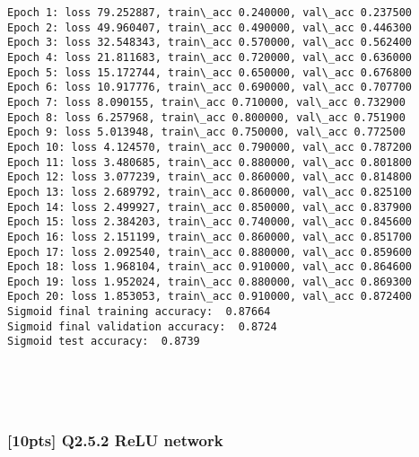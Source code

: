 \documentclass[11pt]{article}
\begin{document}
    \begin{Verbatim}[commandchars=\\\{\}]
Epoch 1: loss 79.252887, train\_acc 0.240000, val\_acc 0.237500
Epoch 2: loss 49.960407, train\_acc 0.490000, val\_acc 0.446300
Epoch 3: loss 32.548343, train\_acc 0.570000, val\_acc 0.562400
Epoch 4: loss 21.811683, train\_acc 0.720000, val\_acc 0.636000
Epoch 5: loss 15.172744, train\_acc 0.650000, val\_acc 0.676800
Epoch 6: loss 10.917776, train\_acc 0.690000, val\_acc 0.707700
Epoch 7: loss 8.090155, train\_acc 0.710000, val\_acc 0.732900
Epoch 8: loss 6.257968, train\_acc 0.800000, val\_acc 0.751900
Epoch 9: loss 5.013948, train\_acc 0.750000, val\_acc 0.772500
Epoch 10: loss 4.124570, train\_acc 0.790000, val\_acc 0.787200
Epoch 11: loss 3.480685, train\_acc 0.880000, val\_acc 0.801800
Epoch 12: loss 3.077239, train\_acc 0.860000, val\_acc 0.814800
Epoch 13: loss 2.689792, train\_acc 0.860000, val\_acc 0.825100
Epoch 14: loss 2.499927, train\_acc 0.850000, val\_acc 0.837900
Epoch 15: loss 2.384203, train\_acc 0.740000, val\_acc 0.845600
Epoch 16: loss 2.151199, train\_acc 0.860000, val\_acc 0.851700
Epoch 17: loss 2.092540, train\_acc 0.880000, val\_acc 0.859600
Epoch 18: loss 1.968104, train\_acc 0.910000, val\_acc 0.864600
Epoch 19: loss 1.952024, train\_acc 0.880000, val\_acc 0.869300
Epoch 20: loss 1.853053, train\_acc 0.910000, val\_acc 0.872400
Sigmoid final training accuracy:  0.87664
Sigmoid final validation accuracy:  0.8724
Sigmoid test accuracy:  0.8739

    \end{Verbatim}

    \begin{center}
    \end{center}
    { \hspace*{\fill} \\}
    
    \begin{center}
    \end{center}
    { \hspace*{\fill} \\}
    
    \hypertarget{pts-q2.5.2-relu-network}{%
\subsubsection{{[}10pts{]} Q2.5.2 ReLU
network}\label{pts-q2.5.2-relu-network}}
\end{document}
